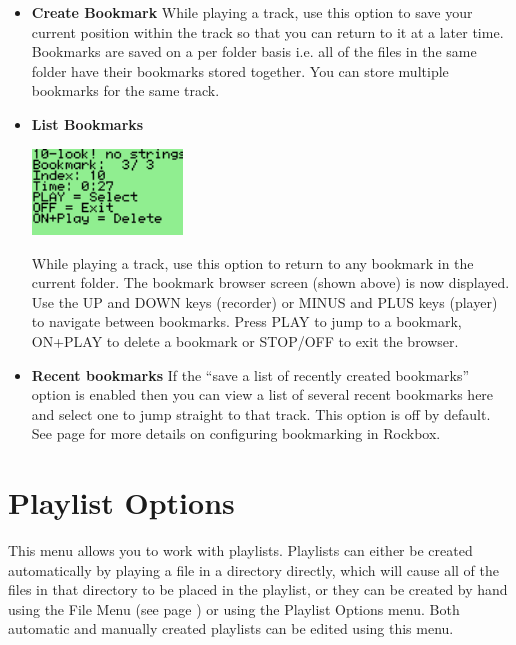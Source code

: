 \begin{itemize}

\item \textbf{Create Bookmark}
While playing a track, use this option to save your current position within the track so that you can return to it at a later time.  Bookmarks are saved on a per folder basis i.e. all of the files in the same folder have their bookmarks stored together. You can store multiple bookmarks for the same track.

\item \textbf{List Bookmarks}
\begin{center}
  \includegraphics[width=4cm]{main_menu/images/ss-list-bookmarks-112x64x1.png}
\end{center}
While playing a track, use this option to return to any bookmark in the current folder.  The bookmark browser screen (shown above) is now displayed.  Use the UP and DOWN keys (recorder) or MINUS and PLUS keys (player) to navigate between bookmarks.  Press PLAY to jump to a bookmark, ON+PLAY to delete a bookmark or STOP/OFF to exit the browser.

\item \textbf {Recent bookmarks}
If the ``save a list of recently created bookmarks'' option is enabled then you can view a list of several recent bookmarks here and select one to jump straight to that track.  This option is off by default. See page \pageref{ref:Bookmarkconfigactual} for more details on configuring bookmarking in Rockbox.
\end{itemize}

\section{\label{ref:playlistoptions}Playlist Options}
This menu allows you to work with playlists. Playlists can either be created automatically by playing a file in a directory directly, which will cause all of the files in that directory to be placed in the playlist, or they can be created by hand using the File Menu (see page \pageref{ref:Filemenu}) or using the Playlist Options menu.  Both  automatic and manually created playlists can be edited using this menu.

